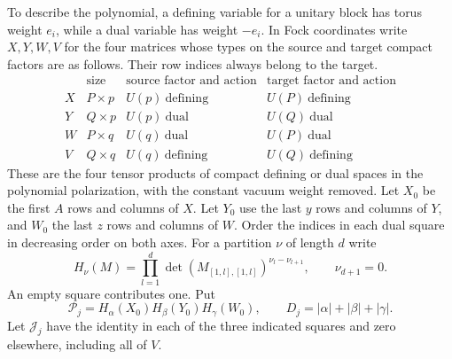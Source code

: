 \documentclass[a4paper,11pt]{article}
\theoremstyle{definition}
\theoremstyle{remark}
\numberwithin{equation}{section}
\begin{document}
To describe the polynomial, a defining variable for a unitary block
has torus weight \(e_i\), while a dual variable has weight \(-e_i\).
In Fock coordinates write \(X,Y,W,V\) for the four matrices whose
types on the source and target compact factors are as follows.
Their row indices always belong to the target.
\[
\begin{array}{c|c|c|c}
 &\text{size}&\text{source factor and action}
                         &\text{target factor and action}\\ \hline
 X&P\times p& U(p)\ \text{defining}&U(P)\ \text{defining}\\
 Y&Q\times p& U(p)\ \text{dual}&U(Q)\ \text{dual}\\
 W&P\times q& U(q)\ \text{dual}&U(P)\ \text{dual}\\
 V&Q\times q& U(q)\ \text{defining}&U(Q)\ \text{defining}
\end{array}
\]
These are the four tensor products of compact defining or dual
spaces in the polynomial polarization, with the constant vacuum
weight removed. Let \(X_0\) be the first \(A\) rows and columns of
\(X\). Let \(Y_0\) use the last \(y\) rows and columns of \(Y\), and
\(W_0\) the last \(z\) rows and columns of \(W\). Order the indices
in each dual square in decreasing order on both axes.
For a partition \(\nu\) of length \(d\) write
\[
 H_\nu(M)=\prod_{l=1}^d
     \det(M_{[1,l],[1,l]})^{\nu_l-\nu_{l+1}},\qquad
 \nu_{d+1}=0.
\]
An empty square contributes one. Put
\begin{equation}
 \mathcal P_j=H_\alpha(X_0)H_\beta(Y_0)H_\gamma(W_0),\qquad
 D_j=|\alpha|+|\beta|+|\gamma|.                       \label{eq:poly187}
\end{equation}
Let
\(\mathcal J_j\) have the identity in each of the three indicated
squares and zero elsewhere, including all of \(V\).
\end{document}
